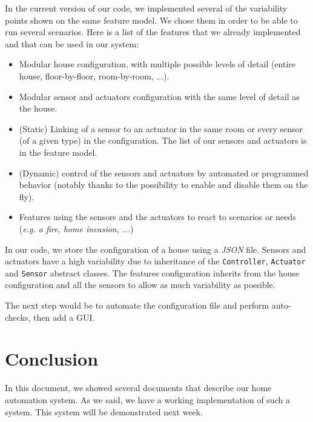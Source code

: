 		In the current version of our code, we implemented several of the variability points shown on the same feature model. We chose them in order to be able to run several scenarios.
		Here is a list of the features that we already implemented and that can be used in our system:
		\begin{itemize}
			\item Modular house configuration, with multiple possible levels of detail (entire house, floor-by-floor, room-by-room, ...).
      \item Modular sensor and actuators configuration with the same level of detail as the house.
      \item (Static) Linking of a sensor to an actuator in the same room or every sensor (of a given type) in the configuration. The list of our sensors and actuators is in the feature model.
      \item (Dynamic) control of the sensors and actuators by automated or programmed behavior (notably thanks to the possibility to enable and disable them on the fly).
      \item Features using the sensors and the actuators to react to scenarios or needs (\emph{e.g. a fire, home invasion, ...})
		\end{itemize}

		In our code, we store the configuration of a house using a \textit{JSON} file.
		Sensors and actuators have a high variability due to inheritance of the \texttt{Controller}, \texttt{Actuator} and \texttt{Sensor} abstract classes. The features configuration inherits from the house configuration and all the sensors to allow as much variability as possible.
		
		The next step would be to automate the configuration file and perform auto-checks, then add a GUI.

	\section{Conclusion}
		In this document, we showed several documents that describe our home automation system.
		As we said, we have a working implementation of such a system. This system will be demonstrated next week.


